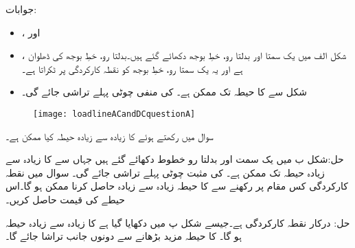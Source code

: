 جوابات:
\begin{itemize}
\item
{}،  اور 
\item
{}، شکل  الف میں یک سمتا اور بدلتا رو، خطِ بوجھ  دکھائے گئے ہیں۔بدلتا رو، خطِ بوجھ  کی ڈھلوان  ہے اور یہ یک سمتا رو، خطِ بوجھ  کو نقطہ کارکردگی پر ٹکراتا ہے۔
\item
شکل سے   کا حیطہ  تک ممکن ہے۔ کی منفی چوٹی پہلے تراشی جائے گی۔
\end{itemize}
%
\begin{figure}
\centering
\texttt{[image: loadlineACandDCquestionA]}
\caption{}
\label{شکل_سوال_ٹرانزسٹر_یکسمتی_بدلتی_بار_خط_الف}
\end{figure}

سوال  میں  رکھتے ہوئے  کا زیادہ سے زیادہ حیطہ کیا ممکن ہے۔

حل:شکل  ب میں یک سمت اور بدلتا رو خطوط دکھائے گئے ہیں جہاں سے  کا زیادہ سے زیادہ حیطہ  تک ممکن ہے۔ کی مثبت چوٹی پہلے تراشی جائے گی۔
سوال  میں نقطہ کارکردگی کس مقام پر رکھنے سے  کا حیطہ زیادہ سے زیادہ حاصل کرنا ممکن ہو گا۔اس حیطے کی قیمت حاصل کریں۔

حل: درکار نقطہ کارکردگی ہے۔جیسے شکل  پ میں دکھایا گیا ہے  کا زیادہ سے زیادہ حیطہ  ہو گا۔ کا حیطہ مزید بڑھانے سے دونوں جانب تراشا جائے گا۔


